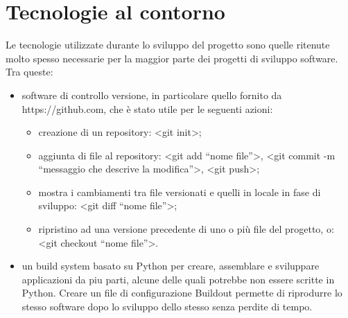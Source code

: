 \section{Tecnologie al contorno}
Le tecnologie utilizzate durante lo sviluppo del progetto sono quelle ritenute molto spesso necessarie per la maggior parte dei progetti di sviluppo software. Tra queste:
\begin{itemize}
\item software di controllo versione, in particolare quello fornito da https://github.com, che è stato utile per le seguenti azioni:
	\begin{itemize}
	\item creazione di un repository: <git init>;
	\item aggiunta di file al repository: <git add “nome file”>, <git commit -m “messaggio che descrive la modifica”>, <git push>;
	\item mostra i cambiamenti tra file versionati e quelli in locale in fase di sviluppo: <git diff “nome file”>;
	\item ripristino ad una versione precedente di uno o più file del progetto, o: <git checkout “nome file”>.
	\end{itemize}
\item un build system basato su Python per creare, assemblare e sviluppare applicazioni da piu parti, alcune delle quali potrebbe non essere scritte in Python. Creare un file di configurazione Buildout permette di riprodurre lo stesso software dopo lo sviluppo dello stesso senza perdite di tempo.


\end{itemize}
